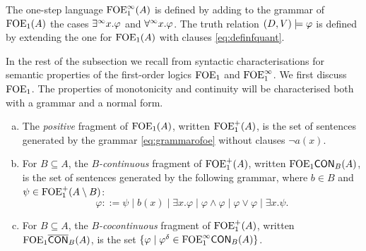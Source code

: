 \begin{definition}
The one-step language $\mathrm{FOE}^{\infty}_1(A)$ is defined by adding to the grammar of $\mathrm{FOE}_1(A)$ the cases $\exists^\infty x. \varphi$ and $\forall^\infty x. \varphi$. The truth relation $(D, V) \models \varphi$ is defined by extending the one for $\mathrm{FOE}_1(A)$ with clauses \eqref{eq:definfquant}.
\end{definition}


In the rest of the subsection we recall from \cite{CFVZ-ModelTheoryPaper} syntactic characterisations for semantic properties of the first-order logics $\mathrm{FOE}_1$ and $\mathrm{FOE}^{\infty}_1$. We first discuss $\mathrm{FOE}_1$. The properties of monotonicity and continuity will be characterised both with a grammar and a normal form.

\begin{definition}
\begin{enumerate}[(a)]
\item The \emph{positive} fragment of $\mathrm{FOE}_1(A)$, written $\mathrm{FOE}_1^{+}(A)$, is the set of sentences generated by the grammar \eqref{eq:grammarofoe} without clauses $\lnot a(x)$. 
\item For $B \subseteq A$, the \emph{$B$-continuous} fragment of $\mathrm{FOE}_1^{+}(A)$, written $\mathrm{FOE}_1\mathsf{CON}_{B}(A)$, is the set of sentences generated by the following grammar, where $b \in B$ and $\psi \in \mathrm{FOE}_1^{+}(A \setminus B)$:
\[
\varphi ::= \psi \mid b(x) \mid \exists x.\varphi \mid \varphi \land \varphi \mid \varphi \lor \varphi \mid \exists x. \psi.
\]
\item For $B \subseteq A$, the \emph{$B$-cocontinuous} fragment of $\mathrm{FOE}_1^{+}(A)$, written $\mathrm{FOE}_1\overline{\mathsf{CON}}_{B}(A)$, is the set $\{\varphi \mid \varphi^\delta \in \mathrm{FOE}^{\infty}_1\mathsf{CON}_{B}(A)\}$.
\end{enumerate}
\end{definition}

